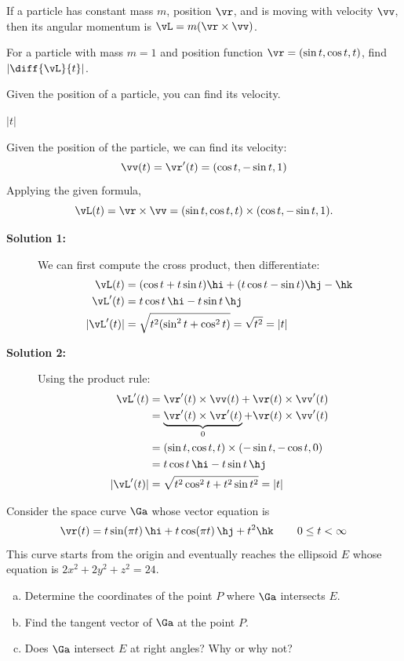 \begin{question}
If a particle has constant mass $m$, position $\vr$, and is moving with velocity $\vv$, then its angular momentum is $\vL=m(\vr\times\vv)$. 

For a particle with mass $m=1$ and position function $\vr=(\sin t, \cos t, t)$, find $\left|\diff{\vL}{t} \right|$.

\end{question}
\begin{hint} 
Given the position of a particle, you can find its velocity.
\end{hint}
\begin{answer}
$|t|$
\end{answer}
\begin{solution}
Given the position of the particle, we can find its velocity:
\[\vv(t)=\vr'(t)=(\cos t, -\sin t , 1)\]
Applying the given formula,
\[\vL(t)=\vr \times \vv=(\sin t , \cos t , t) \times (\cos t, -\sin t , 1).\]
\begin{description}
\item[\textbf{Solution 1:}]
We can first compute the cross product, then differentiate:
\begin{align*}
\vL(t)& = (\cos t + t\sin t)\hi + (t\cos t - \sin t)\hj-\hk\\
\vL'(t)&=t\cos t\,\hi -t\sin t\, \hj\\
|\vL'(t)|&=\sqrt{t^2(\sin^2 t + \cos^2 t)}=\sqrt{t^2}=|t|
\end{align*}
\item[\textbf{Solution 2:}]
Using the product rule:
\begin{align*}
\vL'(t)&=\vr'(t)\times \vv(t) + \vr(t) \times \vv'(t)\\
&=\underbrace{\vr'(t)\times \vr'(t)}_{0} + \vr(t) \times \vv'(t)\\
&= (\sin t ,\cos t,t)\times(-\sin t , -\cos t, 0)\\
&=t\cos t\,\hi-t\sin t\,\hj\\
|\vL'(t)|&=\sqrt{t^2\cos^2 t + t^2\sin t^2  }=|t|
\end{align*}
\end{description}
\end{solution}

\begin{question}[M200 2002A] %
 Consider the space curve $\Ga$ whose vector equation is
\begin{equation*}
\vr(t)=t\sin(\pi t)\,\hi+t\cos(\pi t)\,\hj +t^2\hk\,\qquad 0\le t<\infty
\end{equation*}
This curve starts from the origin and eventually reaches the ellipsoid
$E$ whose equation is $2x^2+2y^2+z^2=24$.
\begin{enumerate}[(a)]
\item
Determine the coordinates of the point $P$ where $\Ga$ intersects $E$.

\item 
Find the tangent vector of $\Ga$ at the point $P$.

\item 
Does $\Ga$ intersect $E$ at right angles? Why or why not?
\end{enumerate}
\end{question}

